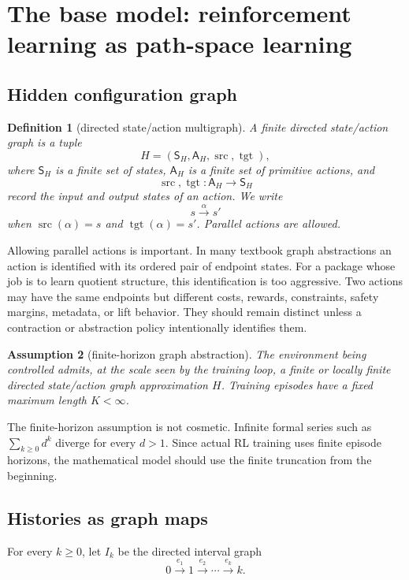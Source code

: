 \documentclass[11pt]{article}
\newtheorem{definition}{Definition}[section]
\newtheorem{assumption}[definition]{Assumption}
\newcommand{\State}{\mathsf{S}}
\newcommand{\Act}{\mathsf{A}}
\newcommand{\src}{\operatorname{src}}
\newcommand{\tgt}{\operatorname{tgt}}
\begin{document}
\section{The base model: reinforcement learning as path-space learning}

\subsection{Hidden configuration graph}

\begin{definition}[directed state/action multigraph]
A finite directed state/action graph is a tuple
\[
    H=(\State_H,\Act_H,\src,\tgt),
\]
where \(\State_H\) is a finite set of states, \(\Act_H\) is a finite set of primitive actions, and
\[
    \src,\tgt:\Act_H\to \State_H
\]
record the input and output states of an action.  We write
\[
    s \xrightarrow{\alpha} s'
\]
when \(\src(\alpha)=s\) and \(\tgt(\alpha)=s'\).  Parallel actions are allowed.
\end{definition}

Allowing parallel actions is important.  In many textbook graph abstractions an action is identified with its ordered pair of endpoint states.  For a package whose job is to learn quotient structure, this identification is too aggressive.  Two actions may have the same endpoints but different costs, rewards, constraints, safety margins, metadata, or lift behavior.  They should remain distinct unless a contraction or abstraction policy intentionally identifies them.

\begin{assumption}[finite-horizon graph abstraction]\label{ass:graph}
The environment being controlled admits, at the scale seen by the training loop, a finite or locally finite directed state/action graph approximation \(H\).  Training episodes have a fixed maximum length \(K<\infty\).
\end{assumption}

The finite-horizon assumption is not cosmetic.  Infinite formal series such as \(\sum_{k\ge 0} d^k\) diverge for every \(d>1\).  Since actual RL training uses finite episode horizons, the mathematical model should use the finite truncation from the beginning.

\subsection{Histories as graph maps}

For every \(k\ge 0\), let \(I_k\) be the directed interval graph
\[
    0 \xrightarrow{e_1} 1 \xrightarrow{e_2} \cdots \xrightarrow{e_k} k.
\]
\end{document}

